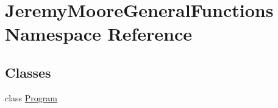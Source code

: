 \hypertarget{namespace_jeremy_moore_general_functions}{}\section{Jeremy\+Moore\+General\+Functions Namespace Reference}
\label{namespace_jeremy_moore_general_functions}
\subsection*{Classes}
\begin{DoxyCompactItemize}
\item 
class \hyperlink{class_jeremy_moore_general_functions_1_1_program}{Program}
\end{DoxyCompactItemize}
